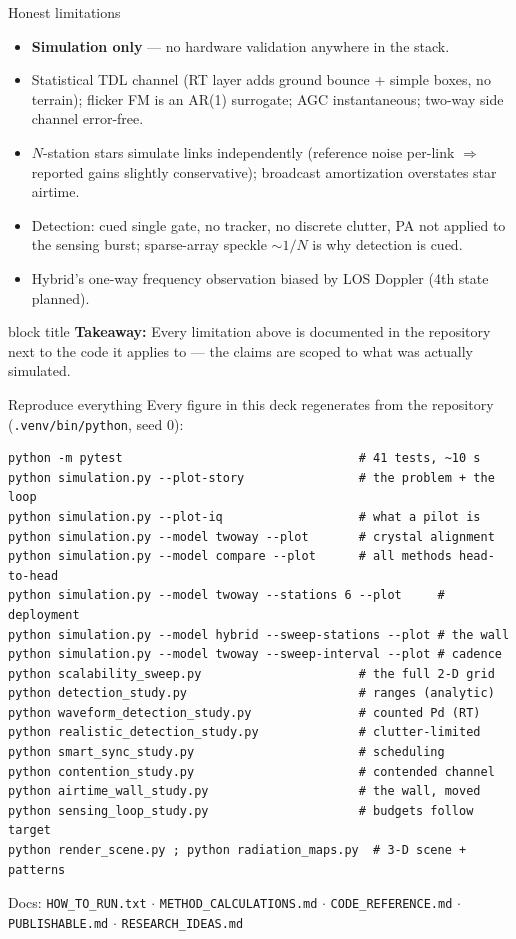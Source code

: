\documentclass[aspectratio=169,10pt]{beamer}
\newcommand{\takeaway}[1]{%
  \vspace{2pt}\begin{beamercolorbox}[rounded=true,sep=4pt]{block title}%
  \small\textbf{Takeaway:} #1\end{beamercolorbox}}
\begin{document}
\begin{frame}{Honest limitations}
  \small
  \begin{itemize}
    \item \textbf{Simulation only} --- no hardware validation anywhere
      in the stack.
    \item Statistical TDL channel (RT layer adds ground bounce +
      simple boxes, no terrain); flicker FM is an AR(1) surrogate;
      AGC instantaneous; two-way side channel error-free.
    \item $N$-station stars simulate links independently (reference
      noise per-link $\Rightarrow$ reported gains slightly
      conservative); broadcast amortization overstates star airtime.
    \item Detection: cued single gate, no tracker, no discrete
      clutter, PA not applied to the sensing burst; sparse-array
      speckle $\sim 1/N$ is why detection is cued.
    \item Hybrid's one-way frequency observation biased by LOS
      Doppler (4th state planned).
  \end{itemize}
  \takeaway{Every limitation above is documented in the repository
  next to the code it applies to --- the claims are scoped to what
  was actually simulated.}
\end{frame}

\begin{frame}[fragile]{Reproduce everything}
  \scriptsize Every figure in this deck regenerates from the
  repository (\texttt{.venv/bin/python}, seed 0):
\begin{verbatim}
python -m pytest                                 # 41 tests, ~10 s
python simulation.py --plot-story                # the problem + the loop
python simulation.py --plot-iq                   # what a pilot is
python simulation.py --model twoway --plot       # crystal alignment
python simulation.py --model compare --plot      # all methods head-to-head
python simulation.py --model twoway --stations 6 --plot     # deployment
python simulation.py --model hybrid --sweep-stations --plot # the wall
python simulation.py --model twoway --sweep-interval --plot # cadence
python scalability_sweep.py                      # the full 2-D grid
python detection_study.py                        # ranges (analytic)
python waveform_detection_study.py               # counted Pd (RT)
python realistic_detection_study.py              # clutter-limited
python smart_sync_study.py                       # scheduling
python contention_study.py                       # contended channel
python airtime_wall_study.py                     # the wall, moved
python sensing_loop_study.py                     # budgets follow target
python render_scene.py ; python radiation_maps.py  # 3-D scene + patterns
\end{verbatim}
  \begin{center}
    \small Docs: \texttt{HOW\_TO\_RUN.txt} $\cdot$
    \texttt{METHOD\_CALCULATIONS.md} $\cdot$
    \texttt{CODE\_REFERENCE.md} $\cdot$ \texttt{PUBLISHABLE.md} $\cdot$
    \texttt{RESEARCH\_IDEAS.md}
  \end{center}
\end{frame}
\end{document}
